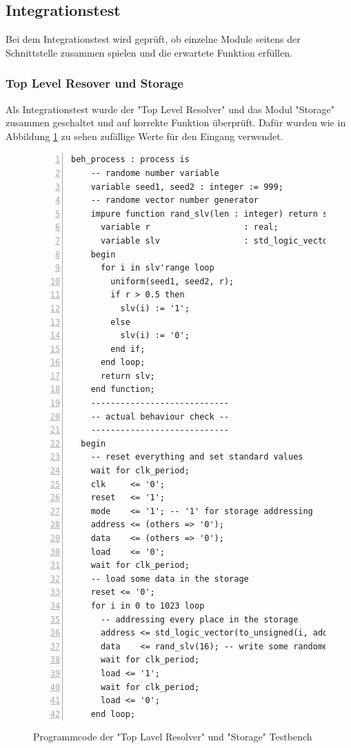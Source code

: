 \documentclass{article}
\numberwithin{equation}{section}
\begin{document}
\subsection{Integrationstest}
Bei dem Integrationstest wird geprüft, ob einzelne Module seitens der Schnittstelle 
zusammen spielen und die erwartete Funktion erfüllen.
\subsubsection{Top Level Resover und Storage}
Als Integrationstest wurde der "Top Level Resolver" und das Modul "Storage" zusammen 
geschaltet und auf korrekte Funktion überprüft. Dafür wurden wie in Abbildung 
\ref{code:tlr_storage_testbench1} zu sehen zufällige Werte für den Eingang verwendet.
\begin{figure}[htbp]
\begin{lstlisting}[style=VHDL,numbers=left,stepnumber=1,style=myCustomMatlabStyle,basicstyle=\footnotesize]
beh_process : process is
    -- randome number variable
    variable seed1, seed2 : integer := 999;
    -- randome vector number generator
    impure function rand_slv(len : integer) return std_logic_vector is
      variable r                   : real;
      variable slv                 : std_logic_vector(len - 1 downto 0);
    begin
      for i in slv'range loop
        uniform(seed1, seed2, r);
        if r > 0.5 then
          slv(i) := '1';
        else
          slv(i) := '0';
        end if;
      end loop;
      return slv;
    end function;
    ----------------------------
    -- actual behaviour check --
    ----------------------------
  begin
    -- reset everything and set standard values
    wait for clk_period;
    clk     <= '0';
    reset   <= '1';
    mode    <= '1'; -- '1' for storage addressing
    address <= (others => '0');
    data    <= (others => '0');
    load    <= '0';
    wait for clk_period;
    -- load some data in the storage
    reset <= '0';
    for i in 0 to 1023 loop
      -- addressing every place in the storage
      address <= std_logic_vector(to_unsigned(i, address'length));
      data    <= rand_slv(16); -- write some randome data in the storage
      wait for clk_period;
      load <= '1';
      wait for clk_period;
      load <= '0';
    end loop;
\end{lstlisting}
\caption{Programmcode der "Top Lavel Resolver" und "Storage" Testbench} \label{code:tlr_storage_testbench1}
\end{figure}
\end{document}
